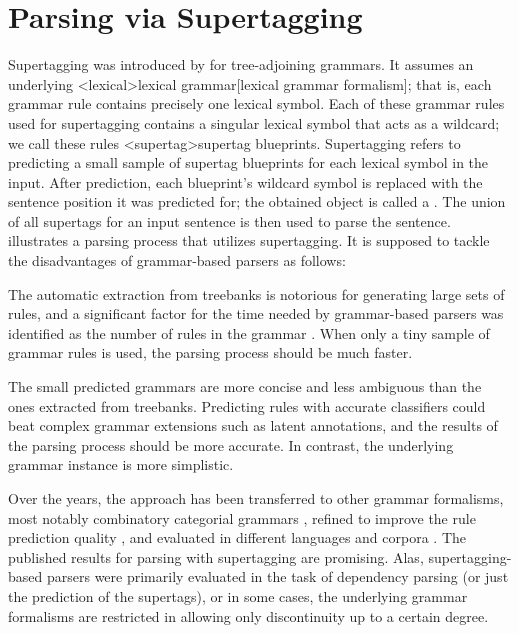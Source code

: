 \documentclass[../document.tex]{subfiles}
\begin{document}
    \section*{Parsing via Supertagging}
    Supertagging was introduced by \citet{bangalore1999supertagging} for tree-adjoining grammars.
    It assumes an underlying <lexical>{lexical grammar}[lexical grammar formalism]; that is, each grammar rule contains precisely one lexical symbol.
    Each of these grammar rules used for supertagging contains a singular lexical symbol that acts as a wildcard; we call these rules <supertag>{supertag blueprints}.
    Supertagging refers to predicting a small sample of supertag blueprints for each lexical symbol in the input.
    After prediction, each blueprint's wildcard symbol is replaced with the sentence position it was predicted for; the obtained object is called a .
    The union of all supertags for an input sentence is then used to parse the sentence.
     illustrates a parsing process that utilizes supertagging.
    It is supposed to tackle the disadvantages of grammar-based parsers as follows:
    \begin{compactitem}
        \item The automatic extraction from treebanks is notorious for generating large sets of rules, and a significant factor for the time needed by grammar-based parsers was identified as the number of rules in the grammar \citep{dunlop2010reducing}.
            When only a tiny sample of grammar rules is used, the parsing process should be much faster.
        \item The small predicted grammars are more concise and less ambiguous than the ones extracted from treebanks.
            Predicting rules with accurate classifiers could beat complex grammar extensions such as latent annotations, and the results of the parsing process should be more accurate. In contrast, the underlying grammar instance is more simplistic.
    \end{compactitem}
    Over the years, the approach has been transferred to other grammar formalisms, most notably combinatory categorial grammars \citep{Clark04}, refined to improve the rule prediction quality \citep{vaswani2016supertagging,Kad18,tian20}, and evaluated in different languages and corpora \citep{Bla18}.
    The published results for parsing with supertagging are promising.
    Alas, supertagging-based parsers were primarily evaluated in the task of dependency parsing (or just the prediction of the supertags), or in some cases, the underlying grammar formalisms are restricted in allowing only discontinuity up to a certain degree.
\end{document}

